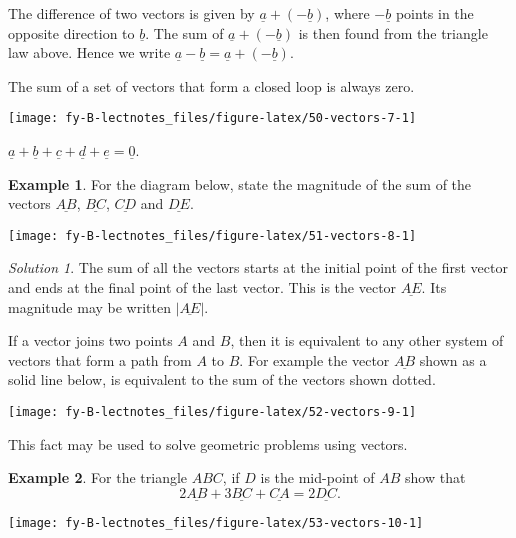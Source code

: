 \documentclass[
  11pt,
  oneside]{book}
\newcommand{\slide}{}
\theoremstyle{definition}
\theoremstyle{definition}
\newtheorem{example}{Example}[chapter]
\theoremstyle{definition}
\theoremstyle{definition}
\theoremstyle{remark}
\newtheorem*{solution}{Solution}
\begin{document}
The difference of two vectors is given by \(\underline a + (-\underline b)\), where \(-\underline b\) points in the opposite direction to \(\underline b\). The sum of \(\underline a + (-\underline b)\) is then found from the triangle law above. Hence we write \(\underline a-\underline b = \underline a + (-\underline b)\).

The sum of a set of vectors that form a closed loop is always zero.

\begin{center}\texttt{[image: fy-B-lectnotes\_files/figure-latex/50-vectors-7-1]} \end{center}

\(\underline a + \underline b + \underline c + \underline d + \underline e = \underline 0\).

\slide

\begin{example}

For the diagram below, state the magnitude of the sum of the vectors \(\underline{AB}\), \(\underline{BC}\), \(\underline{CD}\) and \(\underline{DE}\).

\begin{center}\texttt{[image: fy-B-lectnotes\_files/figure-latex/51-vectors-8-1]} \end{center}

\end{example}

\begin{solution}
The sum of all the vectors starts at the initial point of the first vector and ends at the final point of the last vector. This is the vector \(\underline{AE}\). Its magnitude may be written \(|\underline{AE}|\).
\end{solution}

If a vector joins two points \(A\) and \(B\), then it is equivalent to any other system of vectors that form a path from \(A\) to \(B\). For example the vector \(\underline{AB}\) shown as a solid line below, is equivalent to the sum of the vectors shown dotted.

\begin{center}\texttt{[image: fy-B-lectnotes\_files/figure-latex/52-vectors-9-1]} \end{center}

This fact may be used to solve geometric problems using vectors.

\slide

\begin{example}

For the triangle \(ABC\), if \(D\) is the mid-point of \(AB\) show that
\[
2\underline{AB}+3\underline{BC}+\underline{CA} = 2\underline{DC}.\tag{1}
\]

\begin{center}\texttt{[image: fy-B-lectnotes\_files/figure-latex/53-vectors-10-1]} \end{center}

\end{example}
\end{document}
